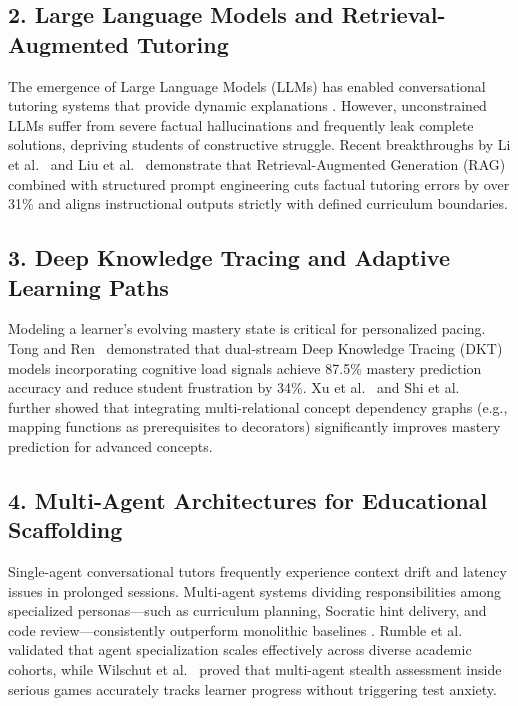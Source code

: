 \subsection{2. Large Language Models and Retrieval-Augmented Tutoring}
The emergence of Large Language Models (LLMs) has enabled conversational tutoring systems that provide dynamic explanations \cite{wang2025llmagents, rumble2025lea, zhang2025evolution}. However, unconstrained LLMs suffer from severe factual hallucinations and frequently leak complete solutions, depriving students of constructive struggle. Recent breakthroughs by Li et al.~\cite{li2025tutorllm} and Liu et al.~\cite{liu2025lpitutor} demonstrate that Retrieval-Augmented Generation (RAG) combined with structured prompt engineering cuts factual tutoring errors by over 31\% and aligns instructional outputs strictly with defined curriculum boundaries.

\subsection{3. Deep Knowledge Tracing and Adaptive Learning Paths}
Modeling a learner's evolving mastery state is critical for personalized pacing. Tong and Ren~\cite{tong2025deepkt} demonstrated that dual-stream Deep Knowledge Tracing (DKT) models incorporating cognitive load signals achieve 87.5\% mastery prediction accuracy and reduce student frustration by 34\%. Xu et al.~\cite{xu2024dkvmn} and Shi et al.~\cite{shi2025denoising} further showed that integrating multi-relational concept dependency graphs (e.g., mapping functions as prerequisites to decorators) significantly improves mastery prediction for advanced concepts.

\subsection{4. Multi-Agent Architectures for Educational Scaffolding}
Single-agent conversational tutors frequently experience context drift and latency issues in prolonged sessions. Multi-agent systems dividing responsibilities among specialized personas---such as curriculum planning, Socratic hint delivery, and code review---consistently outperform monolithic baselines \cite{wang2025llmagents, wang2025eduplanner, rumble2025lea, wilschut2025agenticknowledge}. Rumble et al.~\cite{rumble2025lea} validated that agent specialization scales effectively across diverse academic cohorts, while Wilschut et al.~\cite{wilschut2025agenticknowledge} proved that multi-agent stealth assessment inside serious games accurately tracks learner progress without triggering test anxiety.

